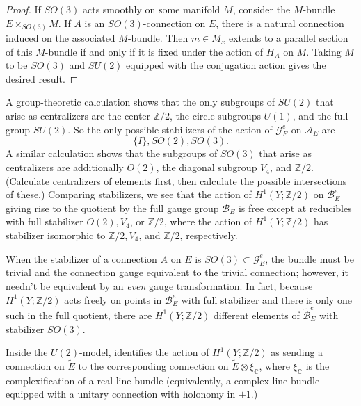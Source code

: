 \documentclass[10pt,a4paper]{amsart}
\theoremstyle{definition}
\theoremstyle{remark}
\numberwithin{figure}{qchap}
\begin{document}
\begin{proof}
If $SO(3)$ acts smoothly on some manifold $M$, consider the $M$-bundle $E \times_{SO(3)} M$. If $A$ is an $SO(3)$-connection on $E$, there is a natural connection induced on the associated $M$-bundle. Then $m \in M_x$ extends to a parallel section of this $M$-bundle if and only if it is fixed under the action of $H_A$ on $M$. Taking $M$ to be $SO(3)$ and $SU(2)$ equipped with the conjugation action gives the desired result.\end{proof}
A group-theoretic calculation shows that the only subgroups of $SU(2)$ that arise as centralizers are the center $\mathbb Z/2$, the circle subgroups $U(1)$, and the full group $SU(2)$. So the only possible stabilizers of the action of $\mathcal G^e_E$ on $\mathcal A_E$ are 
$$\{I\}, SO(2), SO(3).$$
A similar calculation shows that the subgroups of $SO(3)$ that arise as centralizers are additionally $O(2)$, the diagonal subgroup $V_4$, and $\mathbb Z/2$. (Calculate centralizers of elements first, then calculate the possible intersections of these.) Comparing stabilizers, we see that the action of $H^1(Y;\mathbb Z/2)$ on $\mathcal B^e_E$ giving rise to the quotient by the full gauge group $\mathcal B_E$ is free except at reducibles with full stabilizer $O(2), V_4$, or $\mathbb Z/2$, where the action of $H^1(Y;\mathbb Z/2)$ has stabilizer isomorphic to $\mathbb Z/2, V_4$, and $\mathbb Z/2$, respectively.

When the stabilizer of a connection $A$ on $E$ is $SO(3) \subset \mathcal G^e_E$, the bundle must be trivial and the connection gauge equivalent to the trivial connection; however, it needn't be equivalent by an \textit{even} gauge transformation. In fact, because $H^1(Y;\mathbb Z/2)$ acts freely on points in $\mathcal B^e_E$ with full stabilizer and there is only one such in the full quotient, there are $H^1(Y;\mathbb Z/2)$ different elements of $\widetilde{\mathcal B}^e_E$ with stabilizer $SO(3)$. 

Inside the $U(2)$-model, \cite[Section~3]{SS} identifies the action of $H^1(Y;\mathbb Z/2)$ as sending a connection on $\tilde E$ to the corresponding connection on $\tilde E \otimes \xi_{\mathbb C}$, where $\xi_{\mathbb C}$ is the complexification of a real line bundle (equivalently, a complex line bundle equipped with a unitary connection with holonomy in $\pm 1$.)
\end{document}
